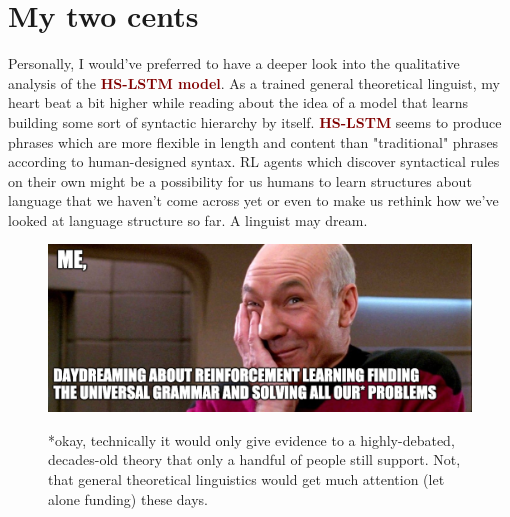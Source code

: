 \documentclass{article}
\begin{document}
\section{My two cents} \label{sec:cents}
Personally, I would've preferred to have a deeper look into the qualitative analysis of the \textcolor{Maroon}{\textbf{HS-LSTM model}}. As a trained general theoretical linguist, my heart beat a bit higher while reading about the idea of a model that learns building some sort of syntactic hierarchy by itself. \textcolor{Maroon}{\textbf{HS-LSTM}} seems to produce phrases which are more flexible in length and content than "traditional" phrases according to human-designed syntax. RL agents which discover syntactical rules on their own might be a possibility for us humans to learn structures about language that we haven't come across yet or even to make us rethink how we've looked at language structure so far. A linguist may dream.
\begin{figure}[h]
    \centering

\includegraphics[scale=.3]{picardsmile.png}
    \label{fig:my_label}
    \caption{*okay, technically it would only give evidence to a highly-debated, decades-old theory that only a handful of people still support. Not, that general theoretical linguistics would get much attention (let alone funding) these days.}
\end{figure}
\end{document}
